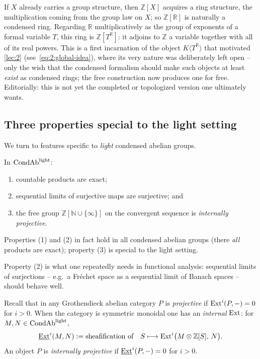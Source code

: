 \begin{remark}
\label{rmk:3:ZG-ring}
If $X$ already carries a group structure, then $\mathbb{Z}[X]$ acquires a ring
structure, the multiplication coming from the group law on $X$; so
$\mathbb{Z}[\mathbb{R}]$ is naturally a condensed ring. Regarding $\mathbb{R}$
multiplicatively as the group of exponents of a formal variable $T$, this ring
is $\mathbb{Z}[T^{\mathbb{R}}]$: it adjoins to $\mathbb{Z}$ a variable together
with all of its real powers. This is a first incarnation of the object
$K\langle T^{\mathbb{R}}\rangle$ that motivated \cref{lec:2}
(see~\eqref{eq:2:global-idea}), where its very nature was deliberately left open
-- only the wish that the condensed formalism should make such objects at least
\emph{exist} as condensed rings; the free construction now produces one for
free. Editorially: this is not yet the completed or topologized version one
ultimately wants.
\end{remark}

\subsection{Three properties special to the light setting}

We turn to features specific to \emph{light} condensed abelian groups.

\begin{theorem}
\label{thm:3:three-properties}
In $\mathrm{CondAb}^{\mathrm{light}}$:
\begin{enumerate}
\item countable products are exact;
\item sequential limits of surjective maps are surjective; and
\item the free group $\mathbb{Z}[\mathbb{N}\cup\{\infty\}]$ on the convergent
sequence is \emph{internally projective}.
\end{enumerate}
Properties \textup{(1)} and \textup{(2)} in fact hold in all condensed abelian
groups (there \emph{all} products are exact); property \textup{(3)} is special to
the light setting.
\end{theorem}

Property (2) is what one repeatedly needs in functional analysis: sequential
limits of surjections -- e.g.\ a Fr\'echet space as a sequential limit of Banach
spaces -- should behave well.

\begin{definition}
\label{def:3:internally-projective}
Recall that in any Grothendieck abelian category $P$ is \emph{projective} if
$\operatorname{Ext}^i(P,-)=0$ for $i>0$. When the category is symmetric monoidal one has an
\emph{internal} $\operatorname{Ext}$: for $M,N\in\mathrm{CondAb}^{\mathrm{light}}$,
\begin{equation*}
\underline{\operatorname{Ext}}^i(M,N):=\text{sheafification of}\quad
S\longmapsto \operatorname{Ext}^i\bigl(M\otimes\mathbb{Z}[S],\,N\bigr).
\end{equation*}
An object $P$ is \emph{internally projective} if $\underline{\operatorname{Ext}}^i(P,-)=0$ for
$i>0$.
\end{definition}

